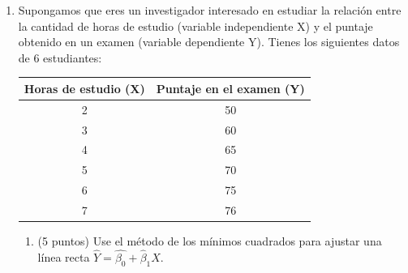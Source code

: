 \documentclass[10pt,a4paper]{article}
\begin{document}
\begin{enumerate}
\begin{enumerate}
        \item (4 puntos) ¿Qué debería suceder con $R^2$ si agregamos más variables independientes a la medición?
        
        {\color{blue} El \( R^2 \) se puede escribir matemáticamente como:

        \[
        R^2 = 1 - \frac{\sum_{i=1}^{N} \hat{u_i}^2}{\sum_{i=1}^{N} (Y_i - \bar{Y})^2}
        \]

        Por lo tanto, el único valor que cambia cuando se agregan variables es \( \sum_{i=1}^{N} \hat{u_i}^2 \), que representa la función valor de la función objetivo, o sea, esta última evaluada en los parámetros que la minimizan. A su vez, por propiedad general de la optimización, la función objetivo {\bf no puede empeorar} si relajamos una restricción. Por ello, la suma de los residuos al cuadrado (la función objetivo de MCO) no puede empeorar si agregamos un regresor, ya que agregar un regresor es equivalente a relajar la restricción, en el sentido de que ahora el parámetro que acompaña a ese regresor no se impone igual a cero. Finalmente, al observar la expresión inicial, una suma de residuos al cuadrado más pequeña implica un mayor \( R^2 \). (4 puntos por interpretación)\\
}    
\end{enumerate}

\item  Supongamos que eres un investigador interesado en estudiar la relación entre la cantidad de horas de estudio (variable independiente X) y el puntaje obtenido en un examen (variable dependiente Y).
Tienes los siguientes datos de 6 estudiantes:

\begin{table}[h!]
\centering
\begin{tabular}{|c|c|}
\hline
\textbf{Horas de estudio (X)} & \textbf{Puntaje en el examen (Y)} \\
\hline
2 & 50 \\
3 & 60 \\
4 & 65 \\
5 & 70 \\
6 & 75 \\
7 & 76 \\
\hline
\end{tabular}
\label{tabla:estudio_puntaje}
\end{table}

\begin{enumerate}
    \item  (5 puntos) Use el método de los mínimos cuadrados para ajustar una línea recta $\hat{Y}=\hat{\beta_0}+\hat{\beta}_1X$.


\end{enumerate}
\end{enumerate}
\end{document}
